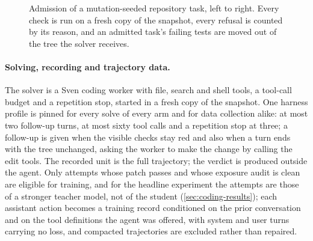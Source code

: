 \begin{figure}[tbp]
\centering
{}
\caption{Admission of a mutation-seeded repository task, left to right. Every check is run on a fresh
copy of the snapshot, every refusal is counted by its reason, and an admitted task's failing tests are
moved out of the tree the solver receives.}\label{fig:valid}
\end{figure}

\paragraph{Solving, recording and trajectory data.} The solver is a Sven coding worker with
file, search and shell tools, a tool-call budget and a repetition stop, started in a fresh
copy of the snapshot. One harness profile is pinned for every solve of every arm and for data
collection alike: at most two follow-up turns, at most sixty tool
calls and a repetition stop at three; a follow-up is given when the visible checks stay red
and also when a turn ends with the tree unchanged, asking the worker to make the change by
calling the edit tools. The
recorded unit is the full trajectory; the verdict is produced outside the agent. Only
attempts whose patch passes and whose exposure audit is clean are eligible for training, and
for the headline experiment the attempts are those of a stronger teacher model, not of the
student (\cref{sec:coding-results}); each assistant action becomes a training record conditioned on the prior
conversation and on the tool definitions the agent was offered, with system and user turns
carrying no loss, and compacted trajectories are excluded rather than repaired.

